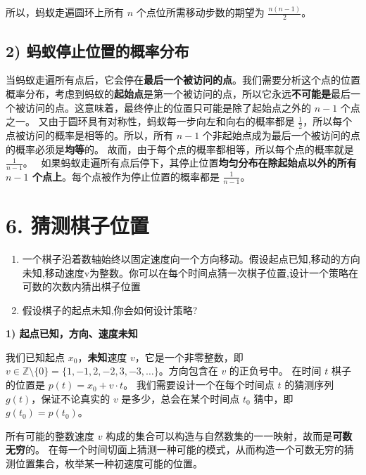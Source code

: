 \documentclass[UTF8]{ctexart}
\begin{document}
所以，蚂蚁走遍圆环上所有 $n$ 个点位所需移动步数的期望为 $\frac{n(n-1)}{2}$。

\subsection*{2) 蚂蚁停止位置的概率分布}

当蚂蚁走遍所有点后，它会停在\textbf{最后一个被访问的点}。我们需要分析这个点的位置概率分布，考虑到蚂蚁的\textbf{起始点}是第一个被访问的点，所以它永远\textbf{不可能是}最后一个被访问的点。这意味着，最终停止的位置只可能是除了起始点之外的 $n-1$ 个点之一。
又由于圆环具有对称性，蚂蚁每一步向左和向右的概率都是 $\frac{1}{2}$，所以每个点被访问的概率是相等的。所以，所有 $n-1$ 个非起始点成为最后一个被访问的点的概率必须是\textbf{均等}的。
故而，由于每个点的概率都相等，所以每个点的概率就是 $\frac{1}{n-1}$。
        \
如果蚂蚁走遍所有点后停下，其停止位置\textbf{均匀分布在除起始点以外的所有 $n-1$ 个点上}。每个点被作为停止位置的概率都是 $\frac{1}{n-1}$。

\section*{6. 猜测棋子位置}

\begin{enumerate}
    \item 一个棋子沿着数轴始终以固定速度向一个方向移动。假设起点已知,移动的方向未知,移动速度v为整数。你可以在每个时间点猜一次棋子位置,设计一个策略在可数的次数内猜出棋子位置
    \item 假设棋子的起点未知,你会如何设计策略?
\end{enumerate}

\textbf{1) 起点已知，方向、速度未知}

我们已知起点 $x_0$，\textbf{未知}速度 $v$，它是一个非零整数，即 $v \in \mathbb{Z} \setminus \{0\} = \{1, -1, 2, -2, 3, -3, \dots\}$。方向包含在 $v$ 的正负号中。
在时间 $t$ 棋子的位置是 $p(t) = x_0 + v \cdot t$。
我们需要设计一个在每个时间点 $t$ 的猜测序列 $g(t)$，保证不论真实的 $v$ 是多少，总会在某个时间点 $t_0$ 猜中，即 $g(t_0) = p(t_0)$。


所有可能的整数速度 $v$ 构成的集合可以构造与自然数集的一一映射，故而是\textbf{可数无穷}的。
在每一个时间切面上猜测一种可能的模式，从而构造一个可数无穷的猜测位置集合，枚举某一种初速度可能的位置。
\end{document}
